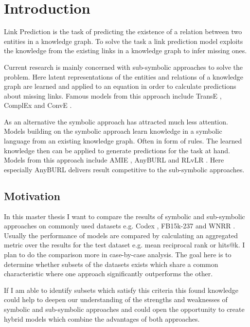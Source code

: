 \chapter{Introduction}
\label{cha:intro}
Link Prediction is the task of predicting the existence of a relation between two entities in a knowledge graph. To solve the task a link prediction model exploits the knowledge from the existing links in a knowledge graph to infer missing ones. 

Current research is mainly concerned with sub-symbolic approaches to solve the problem. Here latent representations of the entities and relations of a knowledge graph are learned and applied to an equation in order to calculate predictions about missing links. Famous models from this approach include TransE \cite{bordes_translating_2013}, ComplEx \cite{trouillon_complex_2016} and ConvE \cite{dettmers_convolutional_2018}.   

As an alternative the symbolic approach has attracted much less attention. \cite{wang_knowledge_2017} Models building on the symbolic approach learn knowledge in a symbolic language from an existing knowledge graph. Often in form of rules. The learned knowledge then can be applied to generate predictions for the task at hand. Models from this approach include AMIE \cite{galarraga_amie_2013}, AnyBURL \cite{meilicke_anytime_2019} and RLvLR \cite{ghiasnezhad_omran_scalable_2018}. Here especially AnyBURL delivers result competitive to the sub-symbolic approaches. 

\section{Motivation}
In this master thesis I want to compare the results of symbolic and sub-symbolic approaches on commonly used datasets e.g. Codex \cite{safavi_codex_2020}, FB15k-237 \cite{toutanova_observed_2015} and WNRR \cite{dettmers_convolutional_2018}. Usually the performance of models are compared by calculating an aggregated metric over the results for the test dataset e.g. mean reciprocal rank or hits@k. I plan to do the comparison more in case-by-case analysis. The goal here is to determine whether subsets of the datasets exists which share a common characteristic where one approach significantly outperforms the other. 

If I am able to identify subsets which satisfy this criteria this found knowledge could help to deepen our understanding of the strengths and weaknesses of symbolic and sub-symbolic approaches and could open the opportunity  to create hybrid models which combine the advantages of both approaches.

